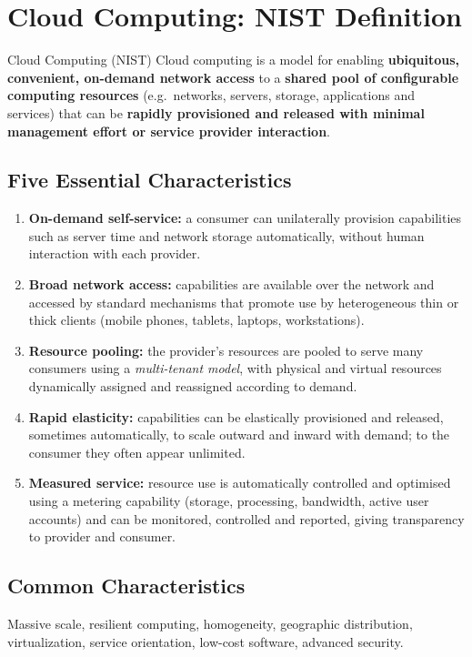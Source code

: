 \section{Cloud Computing: NIST Definition}
\begin{defbox}{Cloud Computing (NIST)}
Cloud computing is a model for enabling \textbf{ubiquitous, convenient, on-demand network access}
to a \textbf{shared pool of configurable computing resources} (e.g.\ networks, servers, storage,
applications and services) that can be \textbf{rapidly provisioned and released with minimal
management effort or service provider interaction}.
\end{defbox}

\subsection{Five Essential Characteristics}
\begin{enumerate}[leftmargin=*]
  \item \textbf{On-demand self-service:} a consumer can unilaterally provision capabilities such
        as server time and network storage automatically, without human interaction with each
        provider.
  \item \textbf{Broad network access:} capabilities are available over the network and accessed
        by standard mechanisms that promote use by heterogeneous thin or thick clients (mobile
        phones, tablets, laptops, workstations).
  \item \textbf{Resource pooling:} the provider's resources are pooled to serve many consumers
        using a \emph{multi-tenant model}, with physical and virtual resources dynamically
        assigned and reassigned according to demand.
  \item \textbf{Rapid elasticity:} capabilities can be elastically provisioned and released,
        sometimes automatically, to scale outward and inward with demand; to the consumer they
        often appear unlimited.
  \item \textbf{Measured service:} resource use is automatically controlled and optimised using a
        metering capability (storage, processing, bandwidth, active user accounts) and can be
        monitored, controlled and reported, giving transparency to provider and consumer.
\end{enumerate}

\subsection{Common Characteristics}
Massive scale, resilient computing, homogeneity, geographic distribution, virtualization,
service orientation, low-cost software, advanced security.

